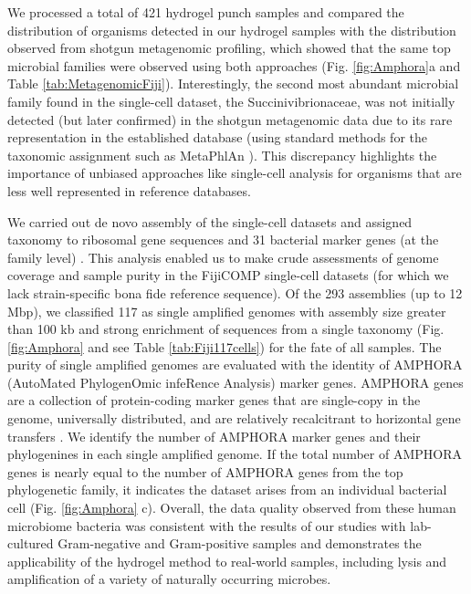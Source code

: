 We processed a total of 421 hydrogel punch samples and compared the distribution of organisms detected in our hydrogel samples with the distribution observed from shotgun metagenomic profiling, which showed that the same top microbial families were observed using both approaches (Fig. \ref{fig:Amphora}a and Table \ref{tab:MetagenomicFiji}). Interestingly, the second most abundant microbial family found in the single-cell dataset, the Succinivibrionaceae, was not initially detected (but later confirmed) in the shotgun metagenomic data due to its rare representation in the established database (using standard methods for the taxonomic assignment such as MetaPhlAn \cite{Segata:2012ts}). This discrepancy highlights the importance of unbiased approaches like single-cell analysis for organisms that are less well represented in reference databases.

We carried out de novo assembly of the single-cell datasets and assigned taxonomy to ribosomal gene sequences and 31  bacterial marker genes (at the family level) \cite{Wu:2012dh}. This analysis enabled us to make crude assessments of genome coverage and sample purity in the FijiCOMP single-cell datasets (for which we lack strain-specific bona fide reference sequence). Of the 293 assemblies (up to 12 Mbp), we classified 117 as single amplified genomes with assembly size greater than 100 kb and strong enrichment of sequences from a single taxonomy (Fig. \ref{fig:Amphora} and see Table \ref{tab:Fiji117cells}) for the fate of all samples. The purity of single amplified genomes are evaluated with the identity of AMPHORA (AutoMated PhylogenOmic infeRence Analysis) marker genes. AMPHORA genes are a collection of protein-coding marker genes that are single-copy in the genome, universally distributed, and are relatively recalcitrant to horizontal gene transfers \cite{Wu:2012dh}. We identify the number of AMPHORA marker genes and their phylogenines in each single amplified genome. If the total number of AMPHORA genes is nearly equal to the number of AMPHORA genes from the top phylogenetic family, it indicates the dataset arises from an individual bacterial cell (Fig. \ref{fig:Amphora} c). Overall, the data quality observed from these human microbiome bacteria was consistent with the results of our studies with lab-cultured Gram-negative and Gram-positive samples and demonstrates the applicability of the hydrogel method to real-world samples, including lysis and amplification of a variety of naturally occurring microbes.


